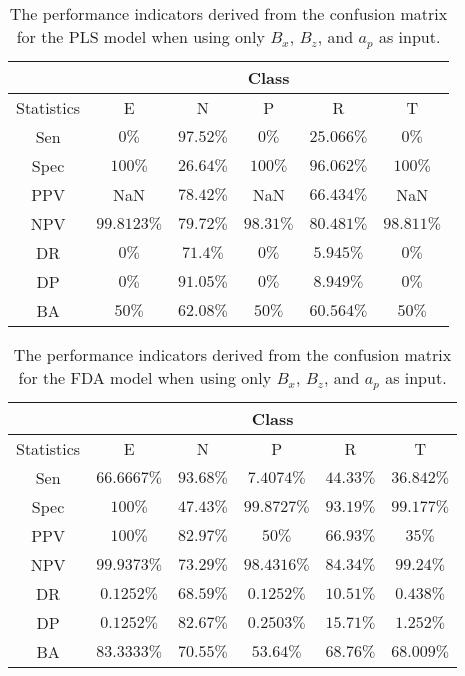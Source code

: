 \begin{table}[!ht]
	\centering
	\begin{tabular}{|c|c|c|c|c|c|}
		\hline
		 & \multicolumn{5}{c|}{Class} \\ \hline
		Statistics & E & N & P & R & T \\ \hline
		Sen & $0\%$ & $97.52\%$ & $0\%$ & $25.066\%$ & $0\%$ \\ \hline
		Spec & $100\%$ & $26.64\%$ & $100\%$ & $96.062\%$ & $100\%$ \\ \hline
		PPV & NaN & $78.42\%$ & NaN & $66.434\%$ & NaN \\ \hline
		NPV & $99.8123\%$ & $79.72\%$ & $98.31\%$ & $80.481\%$ & $98.811\%$ \\ \hline
		DR & $0\%$ & $71.4\%$ & $0\%$ & $5.945\%$ & $0\%$ \\ \hline
		DP & $0\%$ & $91.05\%$ & $0\%$ & $8.949\%$ & $0\%$ \\ \hline
		BA & $50\%$ & $62.08\%$ & $50\%$ & $60.564\%$ & $50\%$ \\ \hline
	\end{tabular}
	\caption{The performance indicators derived from the confusion matrix for the PLS model when using only $B_{x}$, $B_{z}$, and $a_{p}$ as input.}
	\label{tab:cs:reverse:xzap:pls}
\end{table}

\begin{table}[!ht]
	\centering
	\begin{tabular}{|c|c|c|c|c|c|}
		\hline
		 & \multicolumn{5}{c|}{Class} \\ \hline
		Statistics & E & N & P & R & T \\ \hline
		Sen & $66.6667\%$ & $93.68\%$ & $7.4074\%$ & $44.33\%$ & $36.842\%$ \\ \hline
		Spec & $100\%$ & $47.43\%$ & $99.8727\%$ & $93.19\%$ & $99.177\%$ \\ \hline
		PPV & $100\%$ & $82.97\%$ & $50\%$ & $66.93\%$ & $35\%$ \\ \hline
		NPV & $99.9373\%$ & $73.29\%$ & $98.4316\%$ & $84.34\%$ & $99.24\%$ \\ \hline
		DR & $0.1252\%$ & $68.59\%$ & $0.1252\%$ & $10.51\%$ & $0.438\%$ \\ \hline
		DP & $0.1252\%$ & $82.67\%$ & $0.2503\%$ & $15.71\%$ & $1.252\%$ \\ \hline
		BA & $83.3333\%$ & $70.55\%$ & $53.64\%$ & $68.76\%$ & $68.009\%$ \\ \hline
	\end{tabular}
	\caption{The performance indicators derived from the confusion matrix for the FDA model when using only $B_{x}$, $B_{z}$, and $a_{p}$ as input.}
	\label{tab:cs:reverse:xzap:fda}
\end{table}

